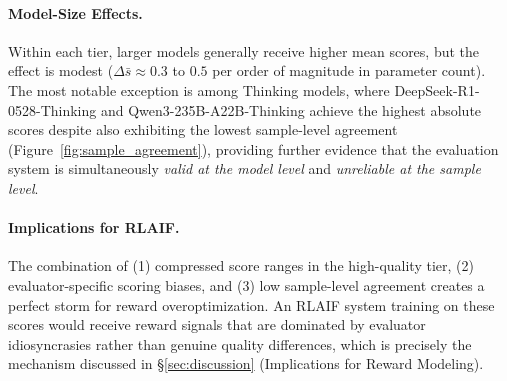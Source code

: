 \documentclass{article}
\begin{document}
\paragraph{Model-Size Effects.} Within each tier, larger models generally receive higher mean scores, but the effect is modest ($\Delta \bar{s} \approx 0.3$ to $0.5$ per order of magnitude in parameter count). The most notable exception is among Thinking models, where DeepSeek-R1-0528-Thinking and Qwen3-235B-A22B-Thinking achieve the highest absolute scores despite also exhibiting the lowest sample-level agreement (Figure~\ref{fig:sample_agreement}), providing further evidence that the evaluation system is simultaneously \textit{valid at the model level} and \textit{unreliable at the sample level}.

\paragraph{Implications for RLAIF.} The combination of (1) compressed score ranges in the high-quality tier, (2) evaluator-specific scoring biases, and (3) low sample-level agreement creates a perfect storm for reward overoptimization. An RLAIF system training on these scores would receive reward signals that are dominated by evaluator idiosyncrasies rather than genuine quality differences, which is precisely the mechanism discussed in \S\ref{sec:discussion} (Implications for Reward Modeling).
\end{document}
